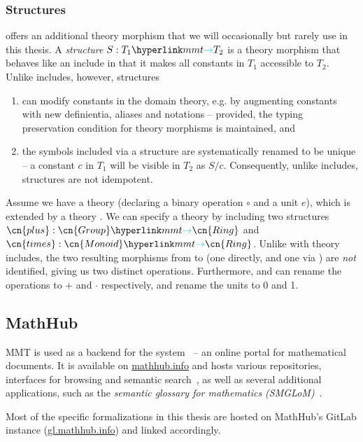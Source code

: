 \subsubsection{Structures}
\mmt offers an additional theory morphism that we will occasionally but rarely use in this thesis. A \emph{structure} $S:\viewto{T_1}{T_2}$ is a theory morphism that behaves like an include in that it makes all constants in $T_1$ accessible to $T_2$. Unlike includes, however, structures 
\begin{enumerate}
	\item can modify constants in the domain theory, e.g. by augmenting constants with new definientia, aliases and notations -- provided, the typing preservation condition for theory morphisms is maintained, and
	\item the symbols included via a structure are systematically renamed to be unique -- a constant $c$ in $T_1$ will be visible in $T_2$ as $S/c$. Consequently, unlike includes, structures are not idempotent.
\end{enumerate}
\begin{example}
	Assume we have a theory  (declaring a binary operation $\circ$ and a unit $e$), which is extended by a theory . We can specify a theory  by including two structures $\cn{plus}:\viewto{\cn{Group}}{\cn{Ring}}$ and $\cn{times}:\viewto{\cn{Monoid}}{\cn{Ring}}$. Unlike with theory includes, the two resulting morphisms from  to  (one directly, and one via ) are \emph{not} identified, giving us two distinct operations. Furthermore,  and  can rename the operations to $+$ and $\cdot$ respectively, and rename the units to 0 and 1.
\end{example}

\subsection{MathHub}\label{sec:intro:mathhub}
MMT is used as a backend for the \mathhub system~\cite{mathhub,MathHub:on} -- an online portal for mathematical documents. It is available on \url{mathhub.info} and hosts various \mmt repositories, interfaces for browsing and semantic search~\cite{mathwebsearch}, as well as several additional applications, such as the \emph{semantic glossary for mathematics (SMGLoM)}~\cite{GinIanJuc:spsttom16}.

Most of the specific \ommt formalizations in this thesis are hosted on MathHub's GitLab instance (\url{gl.mathhub.info}) and linked accordingly.


